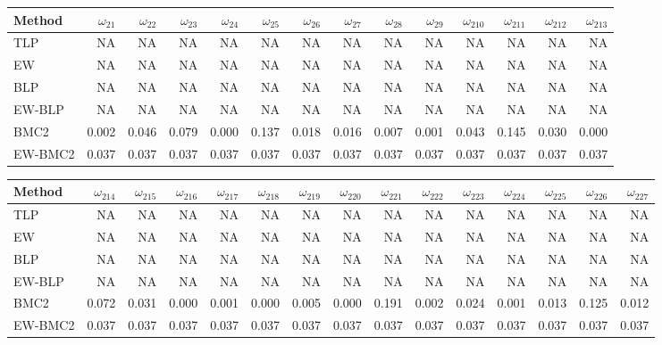 \documentclass[
]{article}
\begin{document}
\begin{tabular}{lrrrrrrrrrrrrr}
\toprule
Method & $\omega_{21}$ & $\omega_{22}$ & $\omega_{23}$ & $\omega_{24}$ & $\omega_{25}$ & $\omega_{26}$ & $\omega_{27}$ & $\omega_{28}$ & $\omega_{29}$ & $\omega_{210}$ & $\omega_{211}$ & $\omega_{212}$ & $\omega_{213}$\\
\midrule
TLP & NA & NA & NA & NA & NA & NA & NA & NA & NA & NA & NA & NA & NA\\
EW & NA & NA & NA & NA & NA & NA & NA & NA & NA & NA & NA & NA & NA\\
BLP & NA & NA & NA & NA & NA & NA & NA & NA & NA & NA & NA & NA & NA\\
EW-BLP & NA & NA & NA & NA & NA & NA & NA & NA & NA & NA & NA & NA & NA\\
BMC2 & 0.002 & 0.046 & 0.079 & 0.000 & 0.137 & 0.018 & 0.016 & 0.007 & 0.001 & 0.043 & 0.145 & 0.030 & 0.000\\
EW-BMC2 & 0.037 & 0.037 & 0.037 & 0.037 & 0.037 & 0.037 & 0.037 & 0.037 & 0.037 & 0.037 & 0.037 & 0.037 & 0.037\\
\bottomrule
\end{tabular}

\begin{tabular}{lrrrrrrrrrrrrrr}
\toprule
Method & $\omega_{214}$ & $\omega_{215}$ & $\omega_{216}$ & $\omega_{217}$ & $\omega_{218}$ & $\omega_{219}$ & $\omega_{220}$ & $\omega_{221}$ & $\omega_{222}$ & $\omega_{223}$ & $\omega_{224}$ & $\omega_{225}$ & $\omega_{226}$ & $\omega_{227}$\\
\midrule
TLP & NA & NA & NA & NA & NA & NA & NA & NA & NA & NA & NA & NA & NA & NA\\
EW & NA & NA & NA & NA & NA & NA & NA & NA & NA & NA & NA & NA & NA & NA\\
BLP & NA & NA & NA & NA & NA & NA & NA & NA & NA & NA & NA & NA & NA & NA\\
EW-BLP & NA & NA & NA & NA & NA & NA & NA & NA & NA & NA & NA & NA & NA & NA\\
BMC2 & 0.072 & 0.031 & 0.000 & 0.001 & 0.000 & 0.005 & 0.000 & 0.191 & 0.002 & 0.024 & 0.001 & 0.013 & 0.125 & 0.012\\
EW-BMC2 & 0.037 & 0.037 & 0.037 & 0.037 & 0.037 & 0.037 & 0.037 & 0.037 & 0.037 & 0.037 & 0.037 & 0.037 & 0.037 & 0.037\\
\bottomrule
\end{tabular}
\end{document}
